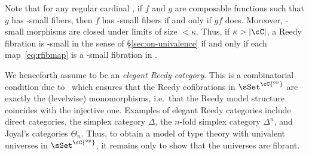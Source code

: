 \documentclass{amsart}
\let\ka\kappa
\theoremstyle{remark}
{\newtheorem{{rmk}}[thm]{{Remark}}}
\numberwithin{equation}{section}
\theoremstyle{plain}
\begin{document}
Note that for any regular cardinal \ka, if $f$ and $g$ are composable functions such that $g$ has \ka-small fibers, then $f$ has \ka-small fibers if and only if $g f$ does.
Moreover, \ka-small morphisms are closed under limits of size $<\ka$.
Thus, if $\ka > |\cC|$, a Reedy fibration is \ka-small in the sense of \S\ref{sec:on-univalence} if and only if each map~\eqref{eq:rfibmap} is a \ka-small fibration in \sSet.

We henceforth assume \cC to be an \emph{elegant Reedy category}.
This is a combinatorial condition due to~\cite{br:reedy} which ensures that the Reedy cofibrations in $\sSet^{\cC{^{\mathrm{op}}}}$ are exactly the (levelwise) monomorphisms, i.e.\ that the Reedy model structure coincides with the injective one.
Examples of elegant Reedy categories include direct categories, the simplex category $\Delta$, the $n$-fold simplex category $\Delta^n$, and Joyal's categories $\Theta_n$.
Thus, to obtain a model of type theory with univalent universes in $\sSet^{\cC{^{\mathrm{op}}}}$, it remains only to show that the universes are fibrant.
\end{document}
